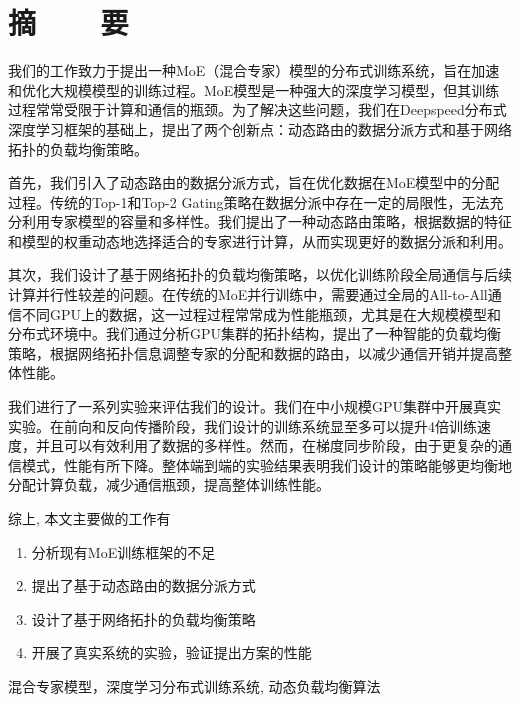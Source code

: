 \renewcommand{\baselinestretch}{1.5}
\fontsize{12pt}{13pt}\selectfont

\chapter[摘要]{摘~~~~要}

我们的工作致力于提出一种MoE（混合专家）模型的分布式训练系统，旨在加速和优化大规模模型的训练过程。MoE模型是一种强大的深度学习模型，但其训练过程常常受限于计算和通信的瓶颈。为了解决这些问题，我们在Deepspeed分布式深度学习框架的基础上，提出了两个创新点：动态路由的数据分派方式和基于网络拓扑的负载均衡策略。

首先，我们引入了动态路由的数据分派方式，旨在优化数据在MoE模型中的分配过程。传统的Top-1和Top-2 Gating策略在数据分派中存在一定的局限性，无法充分利用专家模型的容量和多样性。我们提出了一种动态路由策略，根据数据的特征和模型的权重动态地选择适合的专家进行计算，从而实现更好的数据分派和利用。

其次，我们设计了基于网络拓扑的负载均衡策略，以优化训练阶段全局通信与后续计算并行性较差的问题。在传统的MoE并行训练中，需要通过全局的All-to-All通信不同GPU上的数据，这一过程过程常常成为性能瓶颈，尤其是在大规模模型和分布式环境中。我们通过分析GPU集群的拓扑结构，提出了一种智能的负载均衡策略，根据网络拓扑信息调整专家的分配和数据的路由，以减少通信开销并提高整体性能。

我们进行了一系列实验来评估我们的设计。我们在中小规模GPU集群中开展真实实验。在前向和反向传播阶段，我们设计的训练系统显至多可以提升4倍训练速度，并且可以有效利用了数据的多样性。然而，在梯度同步阶段，由于更复杂的通信模式，性能有所下降。整体端到端的实验结果表明我们设计的策略能够更均衡地分配计算负载，减少通信瓶颈，提高整体训练性能。

综上, 本文主要做的工作有
\vspace{-10pt}
\begin{enumerate}
    \item 分析现有MoE训练框架的不足
    \item 提出了基于动态路由的数据分派方式
    \item 设计了基于网络拓扑的负载均衡策略
    \item 开展了真实系统的实验，验证提出方案的性能
\end{enumerate}
\vspace{-10pt}

\vspace{1em}
 \quad 混合专家模型，深度学习分布式训练系统, 动态负载均衡算法

\endinput
